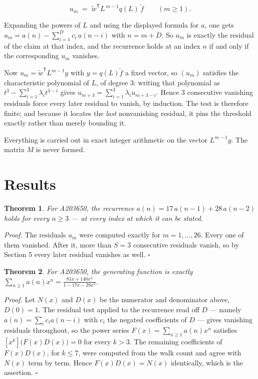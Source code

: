 \documentclass[11pt]{article}
\newtheorem{theorem}{Theorem}
\theoremstyle{definition}
\begin{document}
\[u_m \;=\; \tilde w^{\mathsf T} L^{\,m-1} q(L)\,\tilde f \qquad (m \ge 1).\]

Expanding the powers of $L$ and using the displayed formula for $a$, one gets $u_m = a(n) - \sum_{i=1}^{D} c_i\,a(n-i)$ with $n = m + D$. So $u_m$ is exactly the residual of the claim at that index, and the recurrence holds at an index $n$ if and only if the corresponding $u_m$ vanishes.

Now $u_m = \tilde w^{\mathsf T} L^{m-1} y$ with $y = q(L)\tilde f$ a fixed vector, so $(u_m)$ satisfies the characteristic polynomial of $L$, of degree $3$: writing that polynomial as $t^{3} - \sum_{i=1}^{3} \lambda_i t^{3-i}$ gives $u_{m+3} = \sum_{i=1}^{3} \lambda_i u_{m+3-i}$. Hence $3$ consecutive vanishing residuals force every later residual to vanish, by induction. The test is therefore finite; and because it locates the {\itshape last} nonvanishing residual, it pins the threshold exactly rather than merely bounding it.

Everything is carried out in exact integer arithmetic on the vector $L^{m-1}y$. The matrix $M$ is never formed.

\section{Results}

\begin{theorem} For A203650, the recurrence $a(n) = 17\,a(n-1) + 28\,a(n-2)$ holds for every $n \ge 3$ --- at every index at which it can be stated.\end{theorem}

{\itshape Proof.} The residuals $u_m$ were computed exactly for $m = 1,\dots,26$. Every one of them vanished. After it, more than $S = 3$ consecutive residuals vanish, so by Section 5 every later residual vanishes as well. $\square$

\begin{theorem} For A203650, the generating function is exactly $\sum_{n\ge 1} a(n)x^n = \frac{81x + 140x^{2}}{1 - 17x - 28x^{2}}$.\end{theorem}

{\itshape Proof.} Let $N(x)$ and $D(x)$ be the numerator and denominator above, $D(0)=1$. The residual test applied to the recurrence read off $D$ --- namely $a(n) = \sum_i c_i a(n-i)$ with $c_i$ the negated coefficients of $D$ --- gives vanishing residuals throughout, so the power series $F(x)=\sum_{n\ge 1}a(n)x^n$ satisfies $[x^k]\bigl(F(x)D(x)\bigr) = 0$ for every $k > 3$. The remaining coefficients of $F(x)D(x)$, for $k \le 7$, were computed from the walk count and agree with $N(x)$ term by term. Hence $F(x)D(x) = N(x)$ identically, which is the assertion. $\square$
\end{document}
